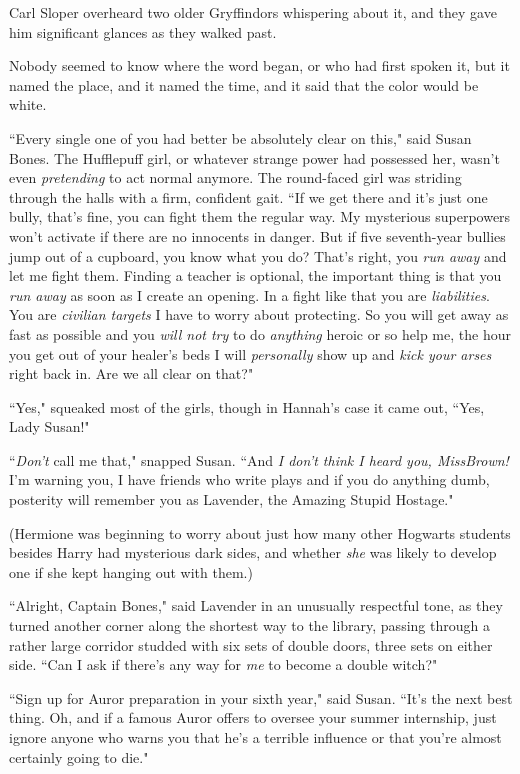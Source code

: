 Carl Sloper overheard two older Gryffindors whispering about it, and they gave him significant glances as they walked past.

Nobody seemed to know where the word began, or who had first spoken it, but it named the place, and it named the time, and it said that the color would be white.

\later

``Every single one of you had better be absolutely clear on this," said Susan Bones. The Hufflepuff girl, or whatever strange power had possessed her, wasn't even \emph{pretending} to act normal anymore. The round-faced girl was striding through the halls with a firm, confident gait. ``If we get there and it's just one bully, that's fine, you can fight them the regular way. My mysterious superpowers won't activate if there are no innocents in danger. But if five seventh-year bullies jump out of a cupboard, you know what you do? That's right, you \emph{run away} and let me fight them. Finding a teacher is optional, the important thing is that you \emph{run away} as soon as I create an opening. In a fight like that you are \emph{liabilities}. You are \emph{civilian targets} I have to worry about protecting. So you will get away as fast as possible and you \emph{will not try} to do \emph{anything} heroic or so help me, the hour you get out of your healer's beds I will \emph{personally} show up and \emph{kick your arses} right back in. Are we all clear on that?"

``Yes," squeaked most of the girls, though in Hannah's case it came out, ``Yes, Lady Susan!"

``\emph{Don't} call me that," snapped Susan. ``And \emph{I don't think I heard you, Miss\?Brown!} I'm warning you, I have friends who write plays and if you do anything dumb, posterity will remember you as Lavender, the Amazing Stupid Hostage."

(Hermione was beginning to worry about just how many other Hogwarts students besides Harry had mysterious dark sides, and whether \emph{she} was likely to develop one if she kept hanging out with them.)

``Alright, Captain Bones," said Lavender in an unusually respectful tone, as they turned another corner along the shortest way to the library, passing through a rather large corridor studded with six sets of double doors, three sets on either side. ``Can I ask if there's any way for \emph{me} to become a double witch?"

``Sign up for Auror preparation in your sixth year," said Susan. ``It's the next best thing. Oh, and if a famous Auror offers to oversee your summer internship, just ignore anyone who warns you that he's a terrible influence or that you're almost certainly going to die."

